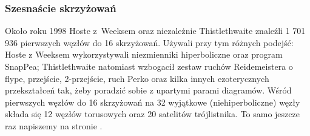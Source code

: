 
\subsubsection{Szesnaście skrzyżowań}
Około roku 1998 Hoste z~Weeksem oraz niezależnie Thistlethwaite \cite{thistlethwaite1998} znaleźli 1 701 936 pierwszych węzłów do 16 skrzyżowań.
%
%
%
Używali przy tym różnych podejść: Hoste z Weeksem wykorzystywali niezmienniki hiperboliczne oraz program SnapPea; Thistlethwaite natomiast wzbogacił zestaw ruchów Reidemeistera o flype, przejście, 2-przejście, ruch Perko oraz kilka innych ezoterycznych przekształceń tak, żeby poradzić sobie z upartymi parami diagramów.
Wśród pierwszych węzłów do 16 skrzyżowań na 32 wyjątkowe (niehiperboliczne) węzły składa się 12 węzłów torusowych oraz 20 satelitów trójlistnika.
To samo jeszcze raz napiszemy na stronie \pageref{page:nonhyperbolic_below_16}.


